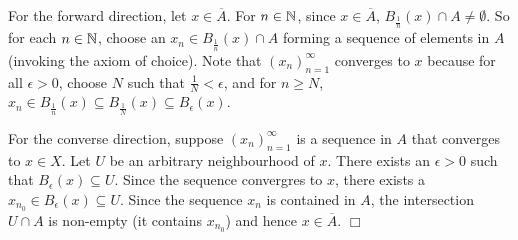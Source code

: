 \documentclass{article}
\begin{document}
 {
    For the forward direction, let $x\in \overline{A}$. For $n\in \mathbb{N}$, since $x\in \overline{A}$, $B_{\frac{1}{n}}(x) \cap A \neq \emptyset$. So for each $n\in \mathbb{N}$, choose an $x_{n}\in B_{\frac{1}{n}}(x)\cap A$ forming a sequence of elements in $A$ (invoking the axiom of choice). Note that $(x_{n})_{n = 1}^{\infty}$ converges to $x$ because for all $\epsilon > 0$, choose $N$ such that $\frac{1}{N}  < \epsilon$, and for $n\geq N$, $x_{n}\in B_{\frac{1}{n}}(x) \subseteq B_{\frac{1}{N}}(x) \subseteq B_{\epsilon}(x)$. 

    For the converse direction, suppose $(x_{n})_{n = 1}^{\infty}$ is a sequence in $A$ that converges to $x\in X$. Let $U$ be an arbitrary neighbourhood of $x$. There exists an $\epsilon> 0$ such that $B_{\epsilon}(x)\subseteq U$. Since the sequence convergres to $x$, there exists a $x_{n_{0}}\in B_{\epsilon}(x)\subseteq U$. Since the sequence $x_{n}$ is contained in $A$, the intersection $U\cap A$ is non-empty (it contains $x_{n_{0}}$) and hence $x\in \overline{A}$. $\Box$  
} 
\end{document}
